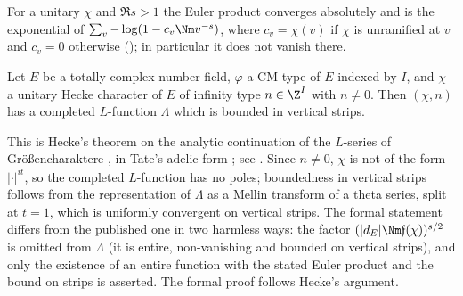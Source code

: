 For a unitary $\chi$ and $\Re s>1$ the Euler product converges absolutely and is the exponential of
$\sum_v-\log(1-c_v\Nm v^{-s})$, where $c_v=\chi(v)$ if $\chi$ is unramified at $v$ and $c_v=0$ otherwise
(); in particular it does not vanish there.

\begin{theorem}\label{pf:sh-div:strips}
Let $E$ be a totally complex number field, $\varphi$ a CM type of $E$ indexed by $I$, and $\chi$ a unitary Hecke character of $E$
of infinity type $n\in\Z^I$ with $n\ne0$. Then $(\chi,n)$ has a completed $L$-function $\Lambda$ which is bounded in vertical
strips.
\end{theorem}

This is Hecke's theorem on the analytic continuation of the $L$-series of Gr\"o\ss{}encharaktere
\cite{Hecke1920}, in Tate's adelic form \cite{Tate1967thesis}; see \cite[Ch.~VII, \S8]{Neukirch1999}. Since $n\ne0$, $\chi$ is
not of the form $|\cdot|^{it}$, so the completed $L$-function has no poles; boundedness in vertical strips follows from the
representation of $\Lambda$ as a Mellin transform of a theta series, split at $t=1$, which is uniformly convergent on vertical
strips. The formal statement differs from the published one in two harmless ways: the factor $(|d_E|\Nm\mathfrak f(\chi))^{s/2}$ is
omitted from $\Lambda$ (it is entire, non-vanishing and bounded on vertical strips), and only the existence of an entire
function with the stated Euler product and the bound on strips is asserted. The formal proof follows Hecke's argument.

